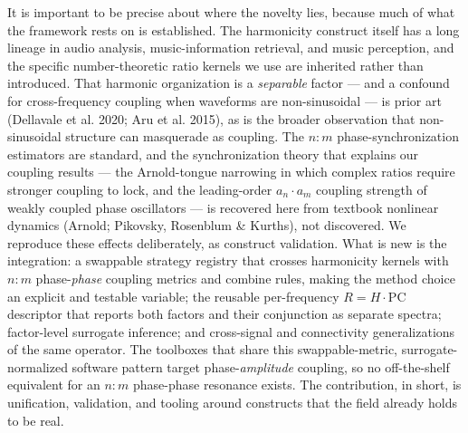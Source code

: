 \documentclass[11pt]{article}
\begin{document}
It is important to be precise about where the novelty lies, because much of what the framework rests on is established. The harmonicity construct itself has a long lineage in audio analysis, music-information retrieval, and music perception, and the specific number-theoretic ratio kernels we use are inherited rather than introduced. That harmonic organization is a \emph{separable} factor — and a confound for cross-frequency coupling when waveforms are non-sinusoidal — is prior art (Dellavale et al. 2020; Aru et al. 2015), as is the broader observation that non-sinusoidal structure can masquerade as coupling. The $n{:}m$ phase-synchronization estimators are standard, and the synchronization theory that explains our coupling results — the Arnold-tongue narrowing in which complex ratios require stronger coupling to lock, and the leading-order $a_n\cdot a_m$ coupling strength of weakly coupled phase oscillators — is recovered here from textbook nonlinear dynamics (Arnold; Pikovsky, Rosenblum \& Kurths), not discovered. We reproduce these effects deliberately, as construct validation. What is new is the integration: a swappable strategy registry that crosses harmonicity kernels with $n{:}m$ phase-\emph{phase} coupling metrics and combine rules, making the method choice an explicit and testable variable; the reusable per-frequency $R = H\cdot\mathrm{PC}$ descriptor that reports both factors and their conjunction as separate spectra; factor-level surrogate inference; and cross-signal and connectivity generalizations of the same operator. The toolboxes that share this swappable-metric, surrogate-normalized software pattern target phase-\emph{amplitude} coupling, so no off-the-shelf equivalent for an $n{:}m$ phase-phase resonance exists. The contribution, in short, is unification, validation, and tooling around constructs that the field already holds to be real.
\end{document}
